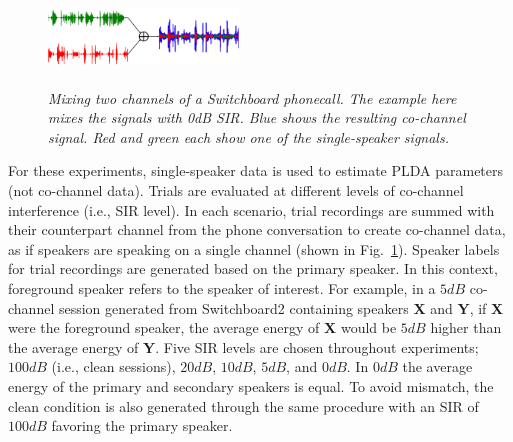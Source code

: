\begin{figure}[t!]
	\vspace{-1mm}
	\centering
	\includegraphics[height = 1.0in, width=0.45\textwidth]{figures/swb_cch_demo-crop}
	\vspace{-1mm}
	\caption{\it \small Mixing two channels of a Switchboard phonecall. The example here mixes the signals with 0dB SIR. Blue shows the resulting co-channel signal. Red and green each show one of the single-speaker signals.}
	\label{fig:mix_swb}
	\vspace{-1mm}
\end{figure}

For these experiments, single-speaker data is used to estimate PLDA parameters (not co-channel data). 
Trials are evaluated at different levels of co-channel interference (i.e., SIR level). 
In each scenario, trial recordings are summed with their counterpart channel from the phone conversation to create co-channel data, as if speakers are speaking on a single channel (shown in Fig.~\ref{fig:mix_swb}). 
Speaker labels for trial recordings are generated based on the primary speaker. 
In this context, foreground speaker refers to the speaker of interest. 
For example, in a $5dB$ co-channel session generated from Switchboard2 containing speakers {\bf X} and {\bf Y}, if {\bf X} were the foreground speaker, the average energy of {\bf X} would be $5dB$ higher than the average energy of {\bf Y}. 
Five SIR levels are chosen throughout experiments; $100dB$ (i.e., clean sessions), $20dB$, $10dB$, $5dB$, and $0dB$. 
In $0dB$ the average energy of the primary and secondary speakers is equal. 
To avoid mismatch, the clean condition is also generated through the same procedure with an SIR of $100dB$ favoring the primary speaker. 

